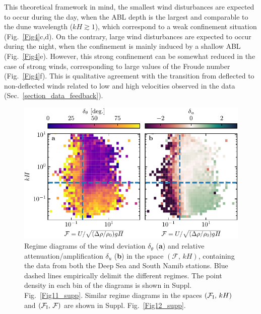 This theoretical framework in mind, the smallest wind disturbances are expected to occur during the day, when the ABL depth is the largest and comparable to the dune wavelength ($k H \gtrsim 1$), which correspond to a weak confinement situation (Fig.~\ref{Fig4}c,d). On the contrary, large wind disturbances are expected to occur during the night, when the confinement is mainly induced by a shallow ABL (Fig.~\ref{Fig4}e). However, this strong confinement can be somewhat reduced in the case of strong winds, corresponding to large values of the Froude number (Fig.~\ref{Fig4}f). This is qualitative agreement with the transition from deflected to non-deflected winds related to low and high velocities observed in the data (Sec.~\ref{section_data_feedback}).


\begin{figure}
\centering
\includegraphics[scale=1]{Figures/Figure5.pdf}
\caption{Regime diagrams of the wind deviation $\delta_{\theta}$ (\textbf{a}) and relative attenuation/amplification $\delta_{u}$ (\textbf{b}) in the space $(\mathcal{F}, \, kH)$, containing the data from both the Deep Sea and South Namib stations. Blue dashed lines empirically delimit the different regimes. The point density in each bin of the diagrams is shown in Suppl. Fig.~\ref{Fig11_supp}. Similar regime diagrams in the spaces $(\mathcal{F}_{\textup{I}}, \, kH)$ and $(\mathcal{F}_{\textup{I}}, \, \mathcal{F})$ are shown in Suppl. Fig.~\ref{Fig12_supp}. }
\label{Fig5}
\end{figure}


